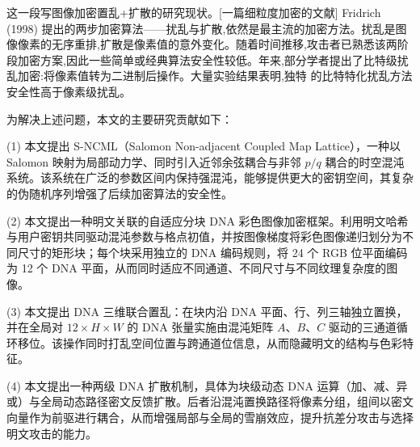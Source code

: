 这一段写图像加密置乱+扩散的研究现状。[一篇细粒度加密的文献]
Fridrich (1998) 提出的两步加密算法——扰乱与扩散,依然是最主流的加密方法。扰乱是图像像素的无序重排,扩散是像素值的意外变化。随着时间推移,攻击者已熟悉该两阶段加密方案,因此一些简单或经典算法安全性较低。年来,部分学者提出了比特级扰乱加密:将像素值转为二进制后操作。大量实验结果表明,独特 的比特特化扰乱方法安全性高于像素级扰乱。

为解决上述问题，本文的主要研究贡献如下：

(1) 本文提出 S-NCML（Salomon Non-adjacent Coupled Map Lattice），一种以 Salomon 映射为局部动力学、同时引入近邻余弦耦合与非邻 $p/q$ 耦合的时空混沌系统。该系统在广泛的参数区间内保持强混沌，能够提供更大的密钥空间，其复杂的伪随机序列增强了后续加密算法的安全性。

(2) 本文提出一种明文关联的自适应分块 DNA 彩色图像加密框架。利用明文哈希与用户密钥共同驱动混沌参数与格点初值，并按图像梯度将彩色图像递归划分为不同尺寸的矩形块；每个块采用独立的 DNA 编码规则，将 24 个 RGB 位平面编码为 12 个 DNA 平面，从而同时适应不同通道、不同尺寸与不同纹理复杂度的图像。

(3) 本文提出 DNA 三维联合置乱：在块内沿 DNA 平面、行、列三轴独立置换，并在全局对 $12\times H\times W$ 的 DNA 张量实施由混沌矩阵 $A$、$B$、$C$ 驱动的三通道循环移位。该操作同时打乱空间位置与跨通道位信息，从而隐藏明文的结构与色彩特征。

(4) 本文提出一种两级 DNA 扩散机制，具体为块级动态 DNA 运算（加、减、异或）与全局动态路径密文反馈扩散。后者沿混沌置换路径将像素分组，组间以密文向量作为前驱进行耦合，从而增强局部与全局的雪崩效应，提升抗差分攻击与选择明文攻击的能力。